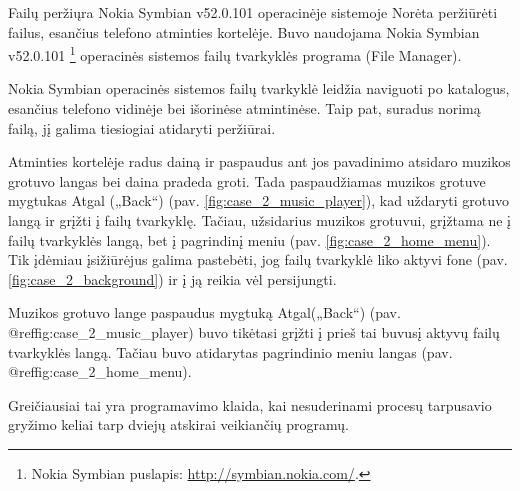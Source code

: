 \begin{xcase}{Failų peržiųra Nokia Symbian v52.0.101 operacinėje sistemoje}
  \xcgoal
  {
    Norėta peržiūrėti failus, esančius telefono atminties kortelėje. 
    Buvo naudojama Nokia Symbian v52.0.101 \footnote{Nokia Symbian puslapis: \url{http://symbian.nokia.com/}.} 
    operacinės sistemos failų tvarkyklės programa (File Manager). 
  }
  
  \xctools
  {
    Nokia Symbian operacinės sistemos failų tvarkyklė leidžia naviguoti po
	katalogus, esančius telefono vidinėje bei išorinėse atmintinėse. Taip 
	pat, suradus norimą failą, jį galima tiesiogiai atidaryti peržiūrai.
  }
  
  \xcresult
  {
    Atminties kortelėje radus dainą ir paspaudus ant jos pavadinimo atsidaro muzikos
    grotuvo langas bei daina pradeda groti. Tada paspaudžiamas muzikos grotuve mygtukas 
    Atgal („Back“) (pav. \ref{fig:case_2_music_player}), kad uždaryti grotuvo langą 
    ir grįžti į failų tvarkyklę. Tačiau, užsidarius muzikos grotuvui, grįžtama ne į
    failų tvarkyklės langą, bet į pagrindinį meniu (pav. \ref{fig:case_2_home_menu}). 
    Tik įdėmiau įsižiūrėjus galima pastebėti, jog failų tvarkyklė liko aktyvi fone 
    (pav. \ref{fig:case_2_background}) ir į ją reikia vėl persijungti.
	
    {
    }
  }
  
  \xcprinciples
  {
    {
      Muzikos grotuvo lange paspaudus mygtuką Atgal(„Back“) (pav. @ref{fig:case_2_music_player}) buvo tikėtasi grįžti 
      į prieš tai buvusį aktyvų failų tvarkyklės langą. Tačiau buvo atidarytas 
      pagrindinio meniu langas (pav. @ref{fig:case_2_home_menu}).
    }
  }
  
  \xcthoughts
  {
    Greičiausiai tai yra programavimo klaida, kai nesuderinami procesų tarpusavio gryžimo keliai
    tarp dviejų atskirai veikiančių programų.
  }
\end{xcase}
